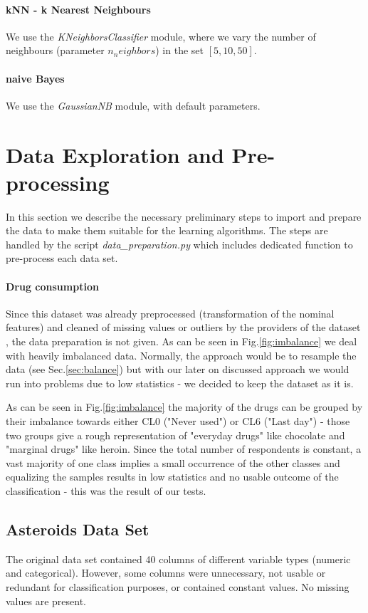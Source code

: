 \documentclass{article}
\begin{document}
\paragraph{kNN - k Nearest Neighbours} We use the \textit{KNeighborsClassifier} module, where we vary the number of neighbours (parameter $n_neighbors$) in the set $[5,10,50]$.

\paragraph{naive Bayes}  We use the \textit{GaussianNB} module, with default parameters.



\section{Data Exploration and Pre-processing}
In this section we describe the necessary preliminary steps to import and prepare the data to make them suitable for the learning algorithms. The steps are handled by the script \textit{data\_preparation.py} which includes dedicated function to pre-process each data set.

\paragraph{Drug consumption}
Since this dataset was already preprocessed (transformation of the nominal features) and cleaned of missing values or outliers by the providers of the dataset \cite{fehrman2017factor}, the data preparation is not given. As can be seen in Fig.\ref{fig:imbalance} we deal with heavily imbalanced data. Normally, the approach would be to resample the data (see Sec.\ref{sec:balance}) but with our later on discussed approach we would run into problems due to low statistics - we decided to keep the dataset as it is.

As can be seen in Fig.\ref{fig:imbalance} the majority of the drugs can be grouped by their imbalance towards either CL0 ("Never used") or CL6 ("Last day") - those two groups give a rough representation of "everyday drugs" like chocolate and "marginal drugs" like heroin. Since the total number of respondents is constant, a vast majority of one class implies a small occurrence of the other classes and equalizing the samples results in low statistics and no usable outcome of the classification - this was the result of our tests. \\

\subsection{Asteroids Data Set}
The original data set contained 40 columns of different variable types (numeric and categorical). However, some columns were unnecessary, not usable or redundant for classification purposes, or contained constant values. No missing values are present. 
\end{document}
